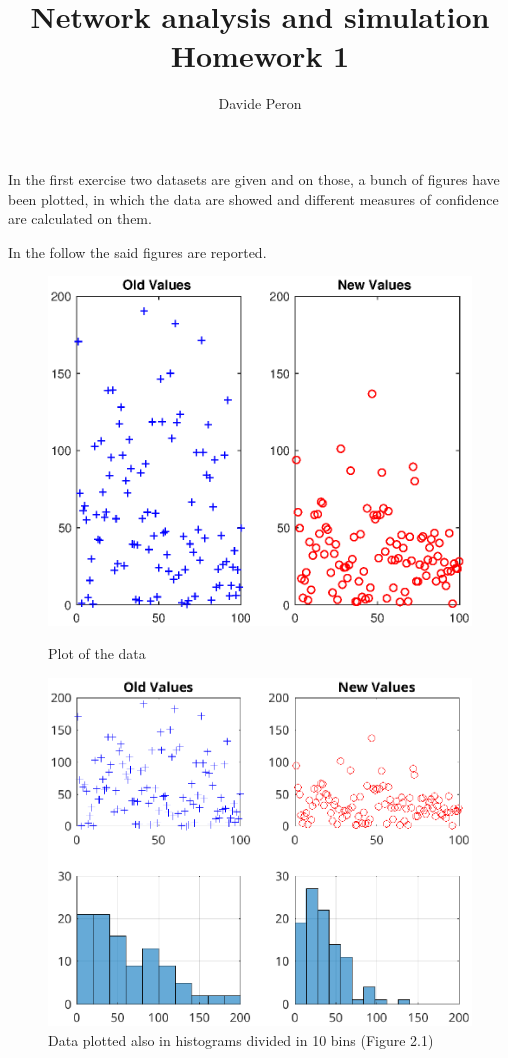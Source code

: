 \documentclass[11pt,a4paper]{article}
\title{\blue Network analysis and simulation\\ Homework 1}
\author{Davide Peron}
\date{}
\begin{document}
\maketitle
\section{}
In the first exercise two datasets are given and on those, a bunch of figures have been plotted, in which the data are showed and different measures of confidence are calculated on them.

In the follow the said figures are reported.

\begin{figure}[ht]
	\centering
	\begin{minipage}{0.45\textwidth}
		\centering
		\includegraphics[width=\textwidth]{ex1fig2_1a}
		\caption{Plot of the data}
		\label{fig:data_exec}
	\end{minipage}
	\begin{minipage}{0.45\textwidth}
		\centering
		\includegraphics[width=\textwidth]{ex1fig2_1}
		\caption{Data plotted also in histograms divided in 10 bins (Figure 2.1)}
		\label{fig:data_exec_hist}
	\end{minipage}
\end{figure}
\end{document}
